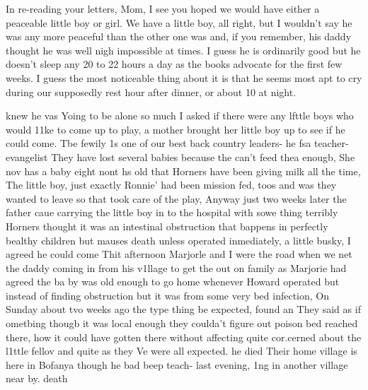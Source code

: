\documentclass[
]{book}
\begin{document}
In re-reading your letters, Mom, I see you hoped we would have either a peaceable little boy or girl. We have a little boy, all right, but I wouldn't say he was any more peaceful than the other one was and, if you remember, his daddy thought he was well nigh impossible at times. I guess he is ordinarily good but he doesn't sleep any 20 to 22 hours a day as the books advocate for the first few weeks. I guess the most noticeable thing about it is that he seems most apt to cry during our supposedly rest hour after dinner, or about 10 at night.

knew he vas Yoing to be alone so much I asked if there were any
lfttle boys who would 11ke to come up to play,
a mother brought her little boy up to see if he could come. Tbe fewily 1s one of our best back country leaders- he fsa teacher-evangelist They have
lost several babies because the can't feed thea enougb, She nov has a baby eight nont hs old that Horners have been giving milk all the time,
The little boy, just exactly Ronnie' had been mission fed, toos and was
they wanted to leave so that took care of the play, Anyway just two weeks later the father caue carrying the little boy in to the hospital with sowe thing terribly Horners thought it was an intestinal obstruction that bappens in perfectly bealthy children but mauses death unless operated inmediately,
a little busky, I agreed he could come
Thit afternoon Marjorle and I were the road when we net the daddy coming in from his v1llage to get the
out on
family as Marjorie had agreed the ba by was old enough to go home whenever
Howard operated but instead of finding
obstruction but it was from some very bed infection,
On Sunday about tvo weeks ago
the type thing be expected, found an
They said as if ometbing thougb it was local enough they coulda't figure out
poison bed reached there,
how it could have gotten there without affecting
quite cor.cerned about the l1ttle fellov and quite as they
Ve were all expected. he died
Their home village is here in Bofanya though he bad beep teach-
last evening,
1ng in another village near by. death

  
\end{document}
